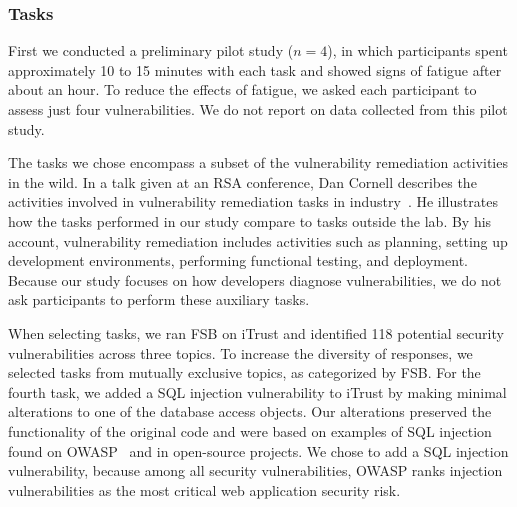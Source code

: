 \documentclass[10pt,journal,compsoc]{IEEEtran}
\begin{document}
%



  
\subsubsection{Tasks}
First we conducted a preliminary pilot study ($n = 4$), in which  participants spent approximately 10 to 15 minutes with each task and showed signs of fatigue after about an hour.
To reduce the effects of fatigue, we asked each participant to assess just four vulnerabilities. 
We do not report on data collected from this pilot study.

The tasks we chose encompass a subset of the vulnerability remediation activities in the wild.
In a talk given at an RSA conference, Dan Cornell describes the activities involved in vulnerability remediation tasks in industry~\cite{cornell2012remediation}.
He illustrates how the tasks performed in our study compare to tasks outside the lab.
By his account, vulnerability remediation includes activities such as planning, setting up development environments, performing functional testing, and deployment.
Because our study focuses on how developers diagnose vulnerabilities, we do not ask participants to perform these auxiliary tasks. 

When selecting tasks, we ran FSB on iTrust and identified 118 potential security vulnerabilities across three topics.
To increase the diversity of responses, we selected tasks from mutually exclusive topics, as categorized by FSB.
For the fourth task, we added a SQL injection vulnerability to iTrust by making minimal alterations to one of the database access objects.
Our alterations preserved the functionality of the original code and were based on examples of SQL injection found on OWASP~\cite{OWASP} and in open-source projects.
We chose to add a SQL injection vulnerability, because among all security vulnerabilities, OWASP ranks injection vulnerabilities as the most critical web application security risk.
\end{document}

